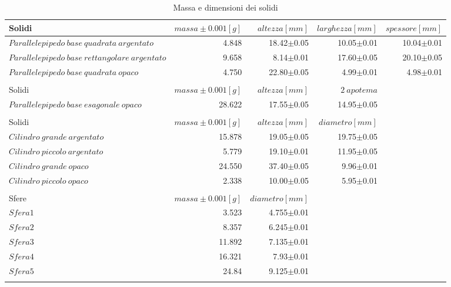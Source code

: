 \documentclass{article}
\begin{document}
	\begin{table}
		\centering
		\begin{adjustbox}{width=\textwidth}
		\begin{tabular}{lrrrr}
			Solidi&$massa\pm0.001[g]$&$altezza[mm]$&$larghezza[mm]$&$spessore[mm]$\\
			\hline
			\hline
			$Parallelepipedo\:base\:quadrata\:argentato$&4.848&18.42$\pm$0.05&10.05$\pm$0.01&10.04$\pm$0.01\\
			$Parallelepipedo\:base\:rettangolare\:argentato$&9.658&8.14$\pm$0.01&17.60$\pm$0.05&20.10$\pm$0.05\\
			$Parallelepipedo\:base\:quadrata\: opaco$&4.750&22.80$\pm$0.05&4.99$\pm$0.01&4.98$\pm$0.01\\
			&&&&\\
			
			Solidi&$massa\pm0.001[g]$&$altezza[mm]$&$2\:apotema$&\\
			\hline
			\hline
			$Parallelepipedo\:base\:esagonale\:opaco$&28.622&17.55$\pm$0.05&14.95$\pm$0.05&\\
			&&&&\\
			
			Solidi&$massa\pm0.001[g]$&$altezza[mm]$&$diametro[mm]$&\\
			\hline
			\hline
			$Cilindro\:grande\:argentato$&15.878&19.05$\pm$0.05&19.75$\pm$0.05&\\
			$Cilindro\:piccolo\:argentato$&5.779&19.10$\pm$0.01&11.95$\pm$0.05&\\
			$Cilindro\:grande\:opaco$&24.550&37.40$\pm$0.05&9.96$\pm$0.01&\\
			$Cilindro\:piccolo\:opaco$&2.338&10.00$\pm$0.05&5.95$\pm$0.01&\\
			&&&&\\
			
			Sfere&$massa\pm0.001[g]$&$diametro[mm]$&&\\
			\hline
			\hline
			$Sfera 1$&3.523&4.755$\pm$0.01&&\\
			$Sfera 2$&8.357&6.245$\pm$0.01&&\\
			$Sfera 3$&11.892&7.135$\pm$0.01&&\\
			$Sfera 4$&16.321&7.93$\pm$0.01&&\\
			$Sfera 5$&24.84&9.125$\pm$0.01&&\\
			&&&&\\
			
		\end{tabular}
		\end{adjustbox}
		\caption{Massa e dimensioni dei solidi}
		\label{massa e dimensione}
	\end{table}
\end{document}
